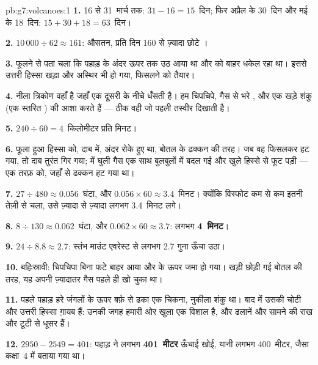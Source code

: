 \begin{solution}{pb:g7:volcanoes:1}
\textbf{1.} 16 से 31~मार्च तक: $31 - 16 = 15$~दिन; फिर अप्रैल के 30~दिन और
मई के 18~दिन: $15 + 30 + 18 = 63$~दिन।

\textbf{2.} $10\,000 \div 62 \approx 161$: औसतन, प्रति दिन 160 से ज़्यादा छोटे
।

\textbf{3.} फूलने से पता चला कि  पहाड़ के अंदर ऊपर तक उठ आया था और 
को बाहर धकेल रहा था। इससे उत्तरी हिस्सा खड़ा और अस्थिर भी हो गया, फिसलने को
तैयार।

\textbf{4.} नीला त्रिकोण वहाँ है जहाँ एक  दूसरी के नीचे धँसती है। हम
चिपचिपे, गैस से भरे ,  और एक खड़े शंकु (एक स्तरित
) की आशा करते हैं --- ठीक वही जो पहली तस्वीर दिखाती है।

\textbf{5.} $240 \div 60 = 4$~किलोमीटर प्रति मिनट।

\textbf{6.} फूला हुआ हिस्सा  को, दाब में, अंदर रोके हुए था, बोतल के ढक्कन
की तरह। जब वह फिसलकर हट गया, तो दाब तुरंत गिर गया;  में घुली गैस एक साथ
बुलबुलों में बदल गई और खुले हिस्से से फूट पड़ी --- एक तरफ़ को, जहाँ से ढक्कन हट
गया था।

\textbf{7.} $27 \div 480 \approx 0.056$~घंटा, और $0.056 \times 60 \approx
3.4$~मिनट। क्योंकि विस्फोट कम से कम इतनी तेज़ी से चला, उसे ज़्यादा से ज़्यादा
लगभग 3.4~मिनट लगे।

\textbf{8.} $8 \div 130 \approx 0.062$~घंटा, और $0.062 \times 60 \approx
3.7$: लगभग \textbf{4~मिनट}।

\textbf{9.} $24 \div 8.8 \approx 2.7$: स्तंभ माउंट एवरेस्ट से लगभग 2.7 गुना
ऊँचा उठा।

\textbf{10.} बहिःस्रावी: चिपचिपा  बिना फटे बाहर आया और  के ऊपर
जमा हो गया। खड़ी छोड़ी गई बोतल की तरह, यह  अपनी ज़्यादातर गैस पहले ही खो
चुका था।

\textbf{11.} पहले पहाड़ हरे जंगलों के ऊपर बर्फ़ से ढका एक चिकना, नुकीला शंकु था।
बाद में उसकी चोटी और उत्तरी हिस्सा ग़ायब हैं: उनकी जगह हमारी ओर खुला एक विशाल
 है, और ढलानें और सामने की  राख और टूटी  से धूसर
हैं।

\textbf{12.} $2950 - 2549 = 401$: पहाड़ ने लगभग \textbf{401~मीटर} ऊँचाई खोई,
यानी लगभग 400~मीटर, जैसा कक्षा~4 में बताया गया था।
\end{solution}
